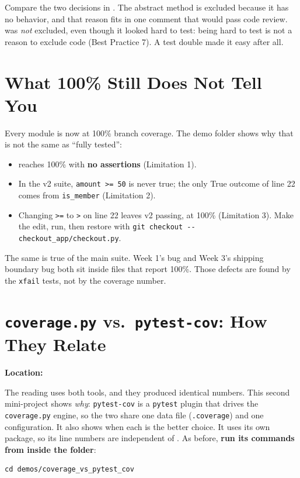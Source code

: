 \documentclass[11pt]{article}
\begin{document}
\begin{tipbox}
Compare the two decisions in . The abstract
method is excluded because it has no behavior, and that reason fits in
one comment that would pass code review.  was
\emph{not} excluded, even though it looked hard to test: being hard to
test is not a reason to exclude code (Best Practice 7). A test double
made it easy after all.
\end{tipbox}

\section{What 100\% Still Does Not Tell You}
Every  module is now at 100\% branch coverage. The demo
folder shows why that is not the same as ``fully tested'':
\begin{itemize}
\item {} reaches 100\% with
\textbf{no assertions} (Limitation 1).
\item In the v2 suite, \texttt{amount >= 50} is never true; the only
True outcome of line 22 comes from \texttt{is\_member} (Limitation 2).
\item Changing \texttt{>=} to \texttt{>} on line 22 leaves v2 passing,
at 100\% (Limitation 3). Make the edit, run, then restore with
\texttt{git checkout -{}- checkout\_app/checkout.py}.
\end{itemize}

\begin{warningbox}
The same is true of the main suite. Week 1's 
bug and Week 3's shipping boundary bug both sit inside files that report
100\%. Those defects are found by the \texttt{xfail} tests, not by the
coverage number.
\end{warningbox}

\section{\texttt{coverage.py} vs.\ \texttt{pytest-cov}: How They Relate}
\textbf{Location:} 

The reading uses both tools, and they produced identical numbers. This
second mini-project shows \emph{why}: \texttt{pytest-cov} is a
\texttt{pytest} plugin that drives the \texttt{coverage.py} engine, so the
two share one data file (\texttt{.coverage}) and one configuration. It
also shows when each is the better choice. It uses its own
 package, so its line numbers are independent of
. As before, \textbf{run its commands from inside the
folder}:
\begin{lstlisting}[style=shellstyle]
cd demos/coverage_vs_pytest_cov
\end{lstlisting}
\end{document}
